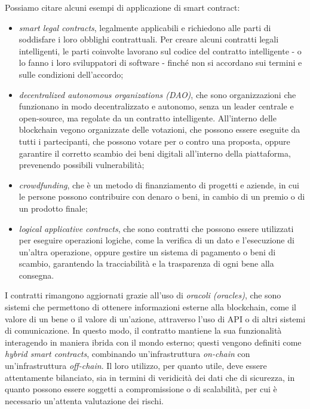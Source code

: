 Possiamo citare alcuni esempi di applicazione di smart contract:
\begin{itemize}
    \item \textit{smart legal contracts}, legalmente applicabili e richiedono alle parti di soddisfare i loro obblighi contrattuali.
    Per creare alcuni contratti legali intelligenti, le parti coinvolte lavorano sul codice del contratto intelligente - o lo fanno i loro sviluppatori di software - finché non si accordano sui termini e sulle condizioni dell'accordo;
    \item \textit{decentralized autonomous organizations (DAO)}, che sono organizzazioni che funzionano in modo decentralizzato e autonomo, senza un leader centrale e open-source, ma regolate da un contratto intelligente.
    All'interno delle blockchain vegono organizzate delle votazioni, che possono essere eseguite da tutti i partecipanti, che possono votare per o contro una proposta,
    oppure garantire il corretto scambio dei beni digitali all'interno della piattaforma, prevenendo possibili vulnerabilità;
    \item \textit{crowdfunding}, che è un metodo di finanziamento di progetti e aziende, in cui le persone possono contribuire con denaro o beni, in cambio di un premio o di un prodotto finale;
    \item \textit{logical applicative contracts}, che sono contratti che possono essere utilizzati per eseguire operazioni logiche, come la verifica di un dato e l'esecuzione di un'altra operazione,
    oppure gestire un sistema di pagamento o beni di scambio, garantendo la tracciabilità e la trasparenza di ogni bene alla consegna.
\end{itemize}

I contratti rimangono aggiornati grazie all'uso di \textit{oracoli (oracles)}, che sono sistemi che permettono di ottenere informazioni esterne alla blockchain, come il valore di un bene o il valore di un'azione,
attraverso l'uso di API o di altri sistemi di comunicazione. In questo modo, il contratto mantiene la sua funzionalità interagendo in maniera ibrida con il mondo esterno; questi vengono definiti come \textit{hybrid smart contracts}, 
combinando un'infrastruttura \textit{on-chain} con un'infrastruttura \textit{off-chain}.
Il loro utilizzo, per quanto utile, deve essere attentamente bilanciato, sia in termini di veridicità dei dati che di sicurezza, in quanto possono essere soggetti a compromissione o di scalabilità, per cui è necessario
un'attenta valutazione dei rischi.

